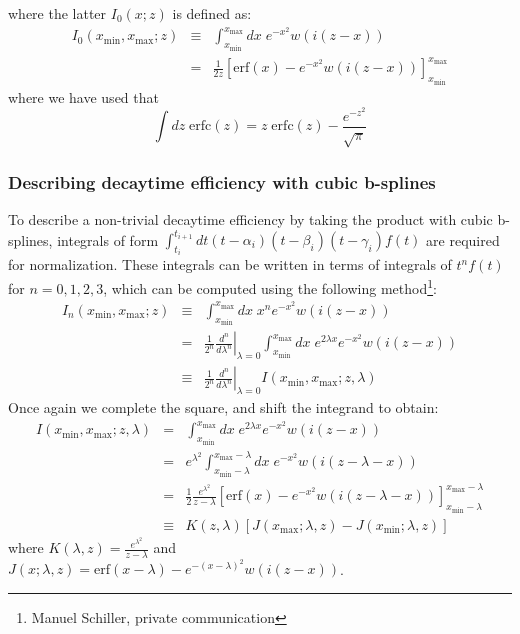 \documentclass[a4paper,10pt,twosided]{article}
\begin{document}
where the latter $I_0(x;z)$ is defined as:
\begin{eqnarray*}
   I_0(x_\mathrm{min},x_\mathrm{max};z) &\equiv& \int_{x_\mathrm{min}}^{x_\mathrm{max}} dx\; e^{-x^2} w\left( i(z-x) \right) 
\\             &=&\frac{1}{2z}\left[ \mathrm{erf}\left(x\right) -e^{-x^2} w\left( i\left(z-x\right) \right) \right]_{x_\mathrm{min}}^{x_\mathrm{max}}
\end{eqnarray*}
where we have used that 
\begin{equation}
    \int dz\; \mathrm{erfc}(z) = z\; \mathrm{erfc}(z) - \frac{e^{-z^2}}{\sqrt{\pi}}
\end{equation}

\subsubsection{Describing decaytime efficiency with cubic b-splines}
To describe a non-trivial decaytime efficiency by taking the product with cubic b-splines, 
integrals of form $\int_{t_i}^{t_{i+1}} dt (t-\alpha_i)(t-\beta_i)(t-\gamma_i) f(t)$ are required for normalization.
These integrals can be written in terms of integrals of $t^nf(t)$ for $n=0,1,2,3$, which can be computed 
using the following method\footnote{Manuel Schiller, private communication}:
\begin{eqnarray*}
    I_n(x_\mathrm{min},x_\mathrm{max};z)&\equiv& \int_{x_\mathrm{min}}^{x_\mathrm{max}} dx\; x^n e^{-x^2} w\left( i (z-x)\right) 
       \\      &  =&  \frac{1}{2^n}\left.\frac{d^n}{d\lambda^n}\right|_{\lambda=0 } \int_{x_\mathrm{min}}^{x_\mathrm{max}} dx\;e^{2\lambda x} e^{-x^2} w\left( i(z-x)\right) 
       \\      & \equiv& \frac{1}{2^n} \left.\frac{d^n}{d\lambda^n}\right|_{\lambda=0 } I(x_\mathrm{min},x_\mathrm{max};z,\lambda)
\end{eqnarray*}
Once again we complete the square, and shift the integrand to obtain:
\begin{eqnarray*}
       I(x_\mathrm{min},x_\mathrm{max};z,\lambda) &=& \int_{x_\mathrm{min}}^{x_\mathrm{max}} dx\; e^{2\lambda x} e^{-x^2} w\left( i(z-x)\right) 
        \\            &=& e^{\lambda^2}\int_{x_\mathrm{min}-\lambda}^{x_\mathrm{max}-\lambda} dx \;  e^{-x^2} w\left(i\left(z-\lambda-x\right) \right)
        \\            &=&\frac{1}{2} \frac{e^{\lambda^2}}{z-\lambda} \left[ \mathrm{erf}\left( x \right) - e^{-x^2}w\left(i\left(z-\lambda-x \right) \right) \right]_{x_\mathrm{min}-\lambda}^{x_\mathrm{max}-\lambda}
        \\            &\equiv& K(z,\lambda) \left[  J(x_\mathrm{max};\lambda,z) - J(x_\mathrm{min};\lambda,z)  \right]
\end{eqnarray*}
where $K(\lambda,z)=\frac{e^{\lambda^2}}{z-\lambda}$ and $J(x;\lambda,z)=\mathrm{erf}\left(x-\lambda\right)-e^{-\left(x-\lambda\right)^2}w\left(i\left(z-x\right) \right)$. 
\end{document}
